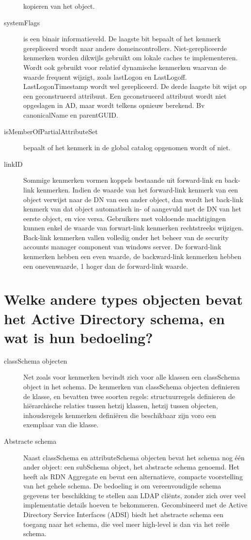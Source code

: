 \begin{description}
		kopieren van het object.
	\item[systemFlags] is een binair informatieveld. De laagste bit bepaalt
		of het kenmerk gerepliceerd wordt naar andere domeincontrollers.
		Niet-gerepliceerde kenmerken worden dikwijls gebruikt om lokale
		caches te implementeren. Wordt ook gebruikt voor relatief
		dynamische kenmerken waarvan de waarde frequent wijzigt, zoals
		lastLogon en LastLogoff. LastLogonTimestamp wordt wel
		gerepliceerd.
		De derde laagste bit wijst op een geconstrueerd attribuut. Een
		geconstrueerd attribuut wordt niet opgeslagen in AD, maar wordt
		telkens opnieuw berekend. Bv canonicalName en parentGUID.
	\item[isMemberOfPartialAttributeSet] bepaalt of het kenmerk in de global
		catalog opgenomen wordt of niet.
	\item[linkID] Sommige kenmerken vormen koppels bestaande uit
		forward-link en back-link kenmerken. Indien de waarde van het
		forward-link kenmerk van een object verwijst naar de DN van een
		ander object, dan wordt het back-link kenmerk van dat object
		automatisch in- of aangevuld met de DN van het eerste object, en
		vice versa. Gebruikers met voldoende machtigingen kunnen enkel
		de waarde van forwart-link kenmerken rechtstreeks wijzigen.
		Back-link kenmerken vallen volledig onder het beheer van de
		security accounts manager component van windows server. De
		forward-link kenmerken hebben een even waarde, de backward-link
		kenmerken hebben een onevenwaarde, 1 hoger dan de forward-link
		waarde.
\end{description}

\section{Welke andere types objecten bevat het Active Directory schema, en wat
is hun bedoeling?}

\begin{description}
	\item[classSchema objecten] Net zoals voor kenmerken bevindt zich voor
		alle klassen een classSchema object in het schema. De kenmerken
		van classSchema objecten definieren de klasse, en bevatten twee
		soorten regels: structuurregels definieren de hiërarchische
		relaties tussen hetzij klassen, hetzij tussen objecten,
		inhoudsregels kenmerken definiëren die beschikbaar zijn voro een
		exemplaar van die klasse.
	\item[Abstracte schema] Naast classSchema en attributeSchema
		objecten bevat het schema nog één ander object: een subSchema
		object, het abstracte schema genoemd. Het heeft als RDN
		Aggregate en bevat een alternatieve, compacte voorstelling van
		het gehele schema. De bedoeling is om vereenvoudigde schema
		gegevens ter beschikking te stellen aan LDAP cliënts, zonder
		zich over veel implementatie details hoeven te bekommeren.
		Gecombineerd met de Active Directory Service Interfaces (ADSI)
		biedt het abstracte schema een toegang naar het schema, die veel
		meer high-level is dan via het reële schema.
\end{description}

